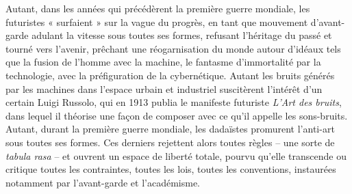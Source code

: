 \documentclass{article}
\begin{document}
Autant, dans les années qui précédèrent la première guerre mondiale, les futuristes « surfaient » sur la vague du progrès, en tant que mouvement d'avant-garde adulant la vitesse sous toutes ses formes, refusant l'héritage du passé et tourné vers l'avenir, prêchant une réogarnisation du monde autour d'idéaux tels que la fusion de l’homme avec la machine, le fantasme d'immortalité par la technologie, avec la préfiguration de la cybernétique. Autant les bruits générés par les machines dans l'espace urbain et industriel suscitèrent l'intérêt d'un certain Luigi Russolo, qui en 1913 publia le manifeste futuriste \textit{L'Art des bruits}, %
dans lequel il théorise une façon de composer avec ce qu'il appelle les sons-bruits. 
Autant, durant la première guerre mondiale, les dadaïstes promurent l'anti-art sous toutes ses formes. Ces derniers rejettent alors toutes règles -- une sorte de \textit{tabula rasa} -- et ouvrent un espace de liberté totale, pourvu qu'elle transcende ou critique toutes les contraintes, toutes les lois, toutes les conventions, instaurées notamment par l'avant-garde et l'académisme. 
\end{document}
